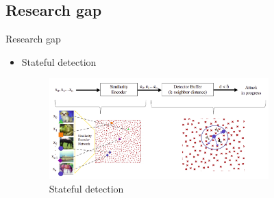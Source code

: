 \documentclass[11pt,t]{beamer}
\begin{document}
%

\subsection{Research gap}
\begin{frame}{Research gap}
\begin{itemize}
	\item Stateful detection
	\begin{figure}
	\centering
	\includegraphics[width=0.8\textwidth]{graphics/stateful_detection.png}
	\caption{Stateful detection \cite{chen2019stateful}\label{fig:stateful_detection}}
	\footnotesize
	\flushleft
	\end{figure}
\end{itemize}
\end{frame}
\end{document}
